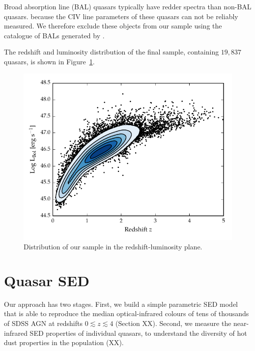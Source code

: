 Broad absorption line (BAL) quasars typically have redder spectra than non-BAL quasars. 
because the CIV line parameters of these quasars can not be reliably measured.
We therefore exclude these objects from our sample using the catalogue of BALs generated by \citet{allen11}.

The redshift and luminosity distribution of the final sample, containing $19,837$ quasars, is shown in Figure~\ref{fig:lum_z}. 

\begin{figure}
  \centering
  \includegraphics[width=\textwidth]{figures/chapter05/lum_z.pdf}
  \caption[{Distribution of our sample in the redshift-luminosity plane.}]{Distribution of our sample in the redshift-luminosity plane.}
  \label{fig:lum_z}
\end{figure}


\section{Quasar SED}

Our approach has two stages. 
First, we build a simple parametric SED model that is able to reproduce the median optical-infrared colours of tens of thousands of SDSS AGN at redshifts $0 \lesssim z \lesssim 4$ (Section XX). 
Second, we measure the near-infrared SED properties of individual quasars, to understand the diversity of hot dust properties in the population (XX).

